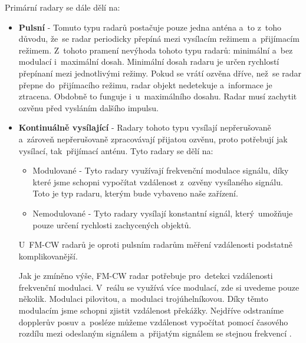 			Primární radary se dále dělí na:
			\begin{itemize}
				\item \textbf{Pulsní}	-	Tomuto typu radarů postačuje pouze jedna anténa a~to z~toho důvodu, že~se radar periodicky přepíná mezi vysílacím režimem a~přijímacím režimem. Z~tohoto pramení nevýhoda tohoto typu radarů: minimální a~bez modulací i~maximální dosah. Minimální dosah radaru je určen rychlostí přepínaní mezi jednotlivými režimy. Pokud se vrátí ozvěna dříve, než~se radar přepne do~přijímacího režimu, radar objekt nedetekuje a~informace je ztracena. Obdobně to funguje i~u~maximálního dosahu. Radar musí zachytit ozvěnu před vysláním dalšího impulsu.
				
				\item \textbf{Kontinuálně vysílající}	-	Radary tohoto typu vysílají nepřerušovaně a~zároveň nepřerušovaně zpracovávají přijatou ozvěnu, proto potřebují jak vysílací, tak~přijímací anténu. Tyto radary se dělí na:
					
					\begin{itemize}
						\item Modulované - Tyto radary využívají frekvenční modulace signálu, díky které jsme schopni vypočítat vzdálenost z~ozvěny vysílaného signálu. Toto je typ radaru, kterým bude vybaveno naše zařízení.
						
						\item Nemodulované - Tyto radary vysílají konstantní signál, který~umožňuje pouze určení rychlosti zachycených objektů.
					\end{itemize}
					
					U~FM-CW\footnotemark{} radarů je oproti pulsním radarům měření vzdálenosti podstatně komplikovanější.\par
					Jak je zmíněno výše, FM-CW radar potřebuje pro~detekci vzdálenosti frekvenční modulaci. V~reálu se využívá více modulací, zde si uvedeme pouze několik. Modulaci pilovitou, a~modulaci trojúhelníkovou. Díky těmto modulacím jsme schopni zjistit vzdálenost překážky. Nejdříve odstraníme dopplerův posuv a~posléze můžeme vzdálenost vypočítat pomocí časového rozdílu mezi odeslaným signálem a~přijatým signálem se stejnou frekvencí \cite{radarHandbook}.
					

\end{itemize}
